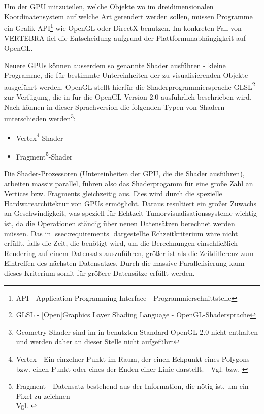 \documentclass[a4paper,titlepage,12pt]{scrartcl}
\newtheorem[L]{boxedDefinition}{Definition}
\begin{document}
Um der GPU mitzuteilen, welche Objekte wo im dreidimensionalen Koordinatensystem auf welche Art gerendert werden sollen, müssen Programme ein Grafik-API\footnote{API - Application Programming Interface - Programmierschnittstelle} wie OpenGL oder DirectX benutzen. Im konkreten Fall von VERTEBRA fiel die Entscheidung aufgrund der Plattformunabhängigkeit auf OpenGL.

Neuere GPUs können ausserdem so genannte Shader ausführen - kleine Programme, die für bestimmte Untereinheiten der zu visualisierenden Objekte ausgeführt werden. OpenGL stellt hierfür die Shaderprogrammiersprache GLSL\footnote{GLSL - [Open]Graphics Layer Shading Language - OpenGL-Shadersprache} zur Verfügung, die in \cite{Rost2006} für die OpenGL-Version 2.0 ausführlich beschrieben wird. Nach \cite[Seite 38-47]{Rost2006} können in dieser Sprachversion die folgenden Typen von Shadern unterschieden werden\footnote{Geometry-Shader sind im in \cite{Rost2006} benutzten Standard OpenGL 2.0 nicht enthalten und werden daher an dieser Stelle nicht aufgeführt}:
\begin{itemize}
 \item Vertex\footnote{Vertex - Ein einzelner Punkt im Raum, der einen Eckpunkt eines Polygons bzw. einen Punkt oder eines der Enden einer Linie darstellt. - Vgl. \cite[Seite 664]{Wright2000} bzw. \cite[Seite 685]{Rost2006}}-Shader
 \item Fragment\footnote{Fragment - Datensatz bestehend aus der Information, die nötig ist, um ein Pixel zu zeichnen\\Vgl. \cite[Seite 675]{Rost2006}}-Shader
\end{itemize}
Die Shader-Prozessoren (Untereinheiten der GPU, die die Shader ausführen), arbeiten massiv parallel, führen also das Shaderprogamm für eine große Zahl an Vertices bzw. Fragments gleichzeitig aus. Dies wird durch die spezielle Hardwarearchitektur von GPUs ermöglicht. Daraus resultiert ein großer Zuwachs an Geschwindigkeit, was speziell für Echtzeit-Tumorvisualisationssysteme wichtig ist, da die Operationen ständig über neuen Datensätzen berechnet werden müssen. Das in \vref{ssec:requirements} dargestellte Echzeitkriterium wäre nicht erfüllt, falls die Zeit, die benötigt wird, um die Berechnungen einschließlich Rendering auf einem Datensatz auszuführen, größer ist als die Zeitdifferenz zum Eintreffen des nächsten Datensatzes. Durch die massive Parallelisierung kann dieses Kriterium somit für größere Datensätze erfüllt werden.
\end{document}

